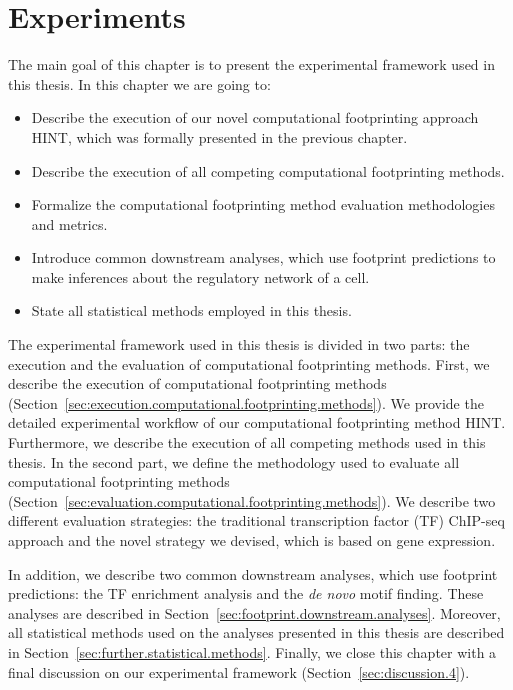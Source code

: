 \chapter{Experiments}
\label{cha:experiments}

\graphicspath{{chapter4/figs/}}

The main goal of this chapter is to present the experimental framework used in this thesis. In this chapter we are going to:
\begin{itemize}
\item Describe the execution of our novel computational footprinting approach HINT, which was formally presented in the previous chapter.
\item Describe the execution of all competing computational footprinting methods.
\item Formalize the computational footprinting method evaluation methodologies and metrics.
\item Introduce common downstream analyses, which use footprint predictions to make inferences about the regulatory network of a cell.
\item State all statistical methods employed in this thesis.
\end{itemize}

The experimental framework used in this thesis is divided in two parts: the execution and the evaluation of computational footprinting methods. First, we describe the execution of computational footprinting methods (Section~\ref{sec:execution.computational.footprinting.methods}). We provide the detailed experimental workflow of our computational footprinting method HINT. Furthermore, we describe the execution of all competing methods used in this thesis. In the second part, we define the methodology used to evaluate all computational footprinting methods (Section~\ref{sec:evaluation.computational.footprinting.methods}). We describe two different evaluation strategies: the traditional transcription factor (TF) ChIP-seq approach and the novel strategy we devised, which is based on gene expression.

In addition, we describe two common downstream analyses, which use footprint predictions: the TF enrichment analysis and the \emph{de novo} motif finding. These analyses are described in Section~\ref{sec:footprint.downstream.analyses}. Moreover, all statistical methods used on the analyses presented in this thesis are described in Section~\ref{sec:further.statistical.methods}. Finally, we close this chapter with a final discussion on our experimental framework (Section~\ref{sec:discussion.4}).


